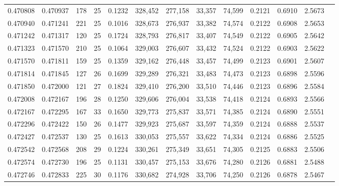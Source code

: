\begin{tabular}{rrrrrrrrrrrrr}
0.470808 & 0.470937 &   178 &  25 &                                     0.1232 & 328,452 & 277,158 &  33,357 &  74,599 & 0.2121 & 0.6910 & 2.5673 \\
0.470940 & 0.471241 &   221 &  25 &                                     0.1016 & 328,673 & 276,937 &  33,382 &  74,574 & 0.2122 & 0.6908 & 2.5653 \\
0.471242 & 0.471317 &   120 &  25 &                                     0.1724 & 328,793 & 276,817 &  33,407 &  74,549 & 0.2122 & 0.6905 & 2.5642 \\
0.471323 & 0.471570 &   210 &  25 &                                     0.1064 & 329,003 & 276,607 &  33,432 &  74,524 & 0.2122 & 0.6903 & 2.5622 \\
0.471570 & 0.471811 &   159 &  25 &                                     0.1359 & 329,162 & 276,448 &  33,457 &  74,499 & 0.2123 & 0.6901 & 2.5607 \\
0.471814 & 0.471845 &   127 &  26 &                                     0.1699 & 329,289 & 276,321 &  33,483 &  74,473 & 0.2123 & 0.6898 & 2.5596 \\
0.471850 & 0.472000 &   121 &  27 &                                     0.1824 & 329,410 & 276,200 &  33,510 &  74,446 & 0.2123 & 0.6896 & 2.5584 \\
0.472008 & 0.472167 &   196 &  28 &                                     0.1250 & 329,606 & 276,004 &  33,538 &  74,418 & 0.2124 & 0.6893 & 2.5566 \\
0.472167 & 0.472295 &   167 &  33 &                                     0.1650 & 329,773 & 275,837 &  33,571 &  74,385 & 0.2124 & 0.6890 & 2.5551 \\
0.472296 & 0.472422 &   150 &  26 &                                     0.1477 & 329,923 & 275,687 &  33,597 &  74,359 & 0.2124 & 0.6888 & 2.5537 \\
0.472427 & 0.472537 &   130 &  25 &                                     0.1613 & 330,053 & 275,557 &  33,622 &  74,334 & 0.2124 & 0.6886 & 2.5525 \\
0.472542 & 0.472568 &   208 &  29 &                                     0.1224 & 330,261 & 275,349 &  33,651 &  74,305 & 0.2125 & 0.6883 & 2.5506 \\
0.472574 & 0.472730 &   196 &  25 &                                     0.1131 & 330,457 & 275,153 &  33,676 &  74,280 & 0.2126 & 0.6881 & 2.5488 \\
0.472746 & 0.472833 &   225 &  30 &                                     0.1176 & 330,682 & 274,928 &  33,706 &  74,250 & 0.2126 & 0.6878 & 2.5467 \\

\end{tabular}
